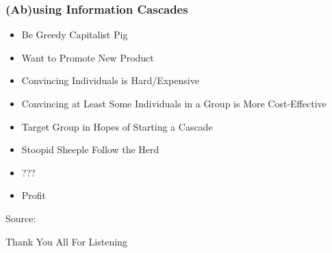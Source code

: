 \documentclass[slidestop,usenames,dvipsnames]{beamer}
\newcommand{\fitem}{\pause\vfill\item}
\begin{document}
\begin{frame}
    \frametitle{(Ab)using Information Cascades}
    \begin{itemize}
        \fitem Be Greedy Capitalist Pig
        \fitem Want to Promote New Product
        \fitem Convincing Individuals is Hard/Expensive
        \fitem Convincing at Least Some Individuals in a Group is More Cost-Effective
        \fitem Target Group in Hopes of Starting a Cascade
        \fitem Stoopid Sheeple Follow the Herd
        \fitem ???
        \fitem Profit
    \end{itemize}
    \vfill
    Source: \cite{eftekhar2013information}
\end{frame}




\begin{frame}
    \vfill
    \begin{center}
        {\Huge Thank You All For Listening}\
    \end{center}
\end{frame}



\end{document}
